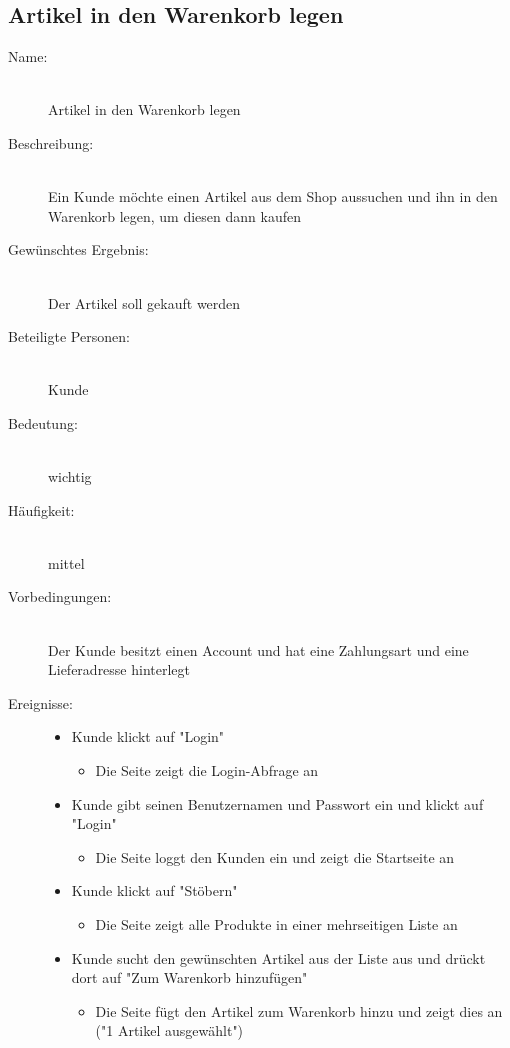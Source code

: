 \documentclass[a4paper]{article}
\begin{document}
\subsection{Artikel in den Warenkorb legen}\begin{description}
	\item[Name:]\hfill \\
	Artikel in den Warenkorb legen
	\item[Beschreibung:]\hfill \\ 
	Ein Kunde möchte einen Artikel aus dem Shop aussuchen und ihn in den Warenkorb legen, um diesen dann kaufen
	\item[Gewünschtes Ergebnis:]\hfill \\ 
	Der Artikel soll gekauft werden
	\item[Beteiligte Personen:]\hfill \\ 
	Kunde
	\item[Bedeutung:]\hfill \\ 
	wichtig
	\item[Häufigkeit:]\hfill \\ 
	mittel
	\item[Vorbedingungen:]\hfill \\ 
	Der Kunde besitzt einen Account und hat eine Zahlungsart und eine Lieferadresse hinterlegt
	\item[Ereignisse:]\hfill
	\begin{itemize}
		\item Kunde klickt auf "Login"
		\begin{itemize}
			\item Die Seite zeigt die Login-Abfrage an
		\end{itemize}
		\item Kunde gibt seinen Benutzernamen und Passwort ein und klickt auf "Login"
		\begin{itemize}
			\item Die Seite loggt den Kunden ein und zeigt die Startseite an
		\end{itemize}
		\item Kunde klickt auf "Stöbern"
		\begin{itemize}
			\item Die Seite zeigt alle Produkte in einer mehrseitigen Liste an
		\end{itemize}
		\item Kunde sucht den gewünschten Artikel aus der Liste aus und drückt dort auf "Zum Warenkorb hinzufügen"
		\begin{itemize}
			\item Die Seite fügt den Artikel zum Warenkorb hinzu und zeigt dies an ("1 Artikel ausgewählt")

\end{itemize}
\end{itemize}
\end{description}
\end{document}
